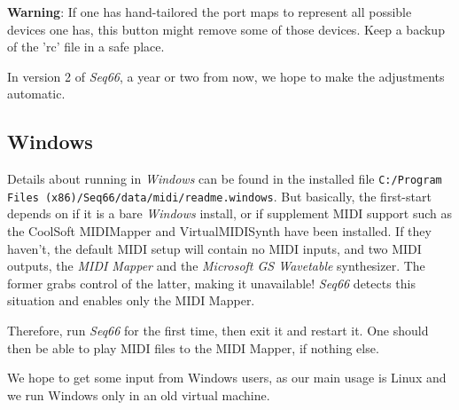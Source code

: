    \textbf{Warning}:
   If one has hand-tailored the port maps to represent all possible devices one
   has, this button might remove some of those devices.
   Keep a backup of the 'rc' file in a safe place.

   In version 2 of \textsl{Seq66}, a year or two from now, we hope to make
   the adjustments automatic.

\subsection{Windows}
\label{subsec:introduction_windows}

   Details about running in \textsl{Windows} can be found in the installed file
   \texttt{C:/Program Files (x86)/Seq66/data/midi/readme.windows}.
   But basically, the first-start depends on if it is a bare \textsl{Windows}
   install, or if supplement MIDI support such as 
   the CoolSoft MIDIMapper and VirtualMIDISynth have been installed.
   If they haven't, the default MIDI setup will contain no MIDI inputs,
   and two MIDI outputs, the \textsl{MIDI Mapper} and the
   \textsl{Microsoft GS Wavetable} synthesizer.
   The former grabs control of the latter, making it unavailable!
   \textsl{Seq66} detects this situation and enables only the MIDI Mapper.

   Therefore, run \textsl{Seq66} for the first time, then exit it and
   restart it. One should then be able to play MIDI files to the MIDI Mapper,
   if nothing else.

   We hope to get some input from Windows users, as our main usage is Linux
   and we run Windows only in an old virtual machine.

